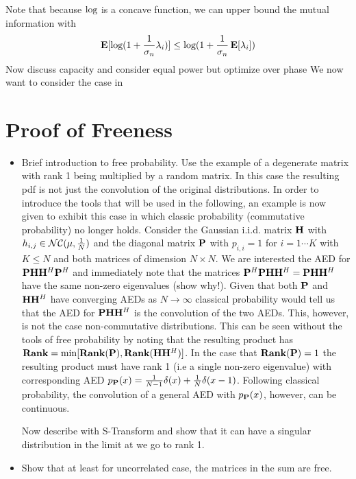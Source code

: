 \documentclass[12pt,a4paper]{report}
\begin{document}
Note that because $\text{log{}}$ is a concave function, we can upper bound the mutual information with
\begin{equation}\label{mut_inf}
\mathop{\bf E{}}[\text{log{}}(1 + \frac{1}{\sigma_n}\lambda_i)] \leq \text{log{}}(1 + \frac{1}{\sigma_n}\mathop{\bf E{}}[\lambda_i])
\end{equation}
Now discuss capacity and consider equal power but optimize over phase
We now want to consider the case in 

\section{Proof of Freeness}
\begin{itemize}

\item 
	Brief introduction to free probability.
	Use the example of a degenerate matrix with rank 1 being multiplied by a random matrix. 
	In this case the resulting pdf is not just the convolution of the original distributions. 
	In order to introduce the tools that will be used in the following, an example is now given to
	exhibit this case in which classic probability (commutative probability) no longer holds.
	Consider the Gaussian i.i.d. matrix $\mathbf{H}$ with $ h_{i,j} \in \mathcal{NC}(\mu,\frac{1}{N})$ and the diagonal matrix $\mathbf{P}$ with 
	$p_{i,i} = 1$ for $i = 1 \cdots K$ with $K \leq N$ and both matrices of dimension $N \times N$. 
	We are interested the AED for $\mathbf{P}\mathbf{H} \mathbf{H}^H \mathbf{P}^H$ and immediately note  that the matrices
	$ \mathbf{P}^H \mathbf{P} \mathbf{H} \mathbf{H}^H = \mathbf{P} \mathbf{H} \mathbf{H}^H$ have the same non-zero eigenvalues (show why!). 
	Given that both $ \mathbf{P}$ and  $\mathbf{H} \mathbf{H}^H$ have converging AEDs as $N \rightarrow \infty$
	classical probability would tell us that the AED for $\mathbf{P} \mathbf{H} \mathbf{H}^H$ is the convolution of the two AEDs. 
	This, however, is not the case non-commutative distributions. This can be seen without the tools of free probability by noting
	that the resulting product has $\mathop{\bf Rank} = \min[\mathop{\bf Rank}(\mathbf{P}), \mathop{\bf Rank}(\mathbf{H} \mathbf{H}^H)]$. In the case that $\mathop{\bf Rank}(\mathbf{P}) = 1$
	the resulting product must have rank 1 (i.e a single non-zero eigenvalue) with corresponding AED
	$p_{\mathbf{P}}(x) = \frac{1}{N-1}\delta(x)  + \frac{1}{N}\delta(x-1)$. Following classical probability, the convolution of 
	a general AED with $p_{\mathbf{P}}(x)$, however, can be continuous. 
	\par 
	Now describe with S-Transform and show that it can have a singular distribution in the limit at we go to rank 1. 
		
\item 
	Show that at least for uncorrelated case, the matrices in the sum are free. 
	
	
\end{itemize}
\end{document}
